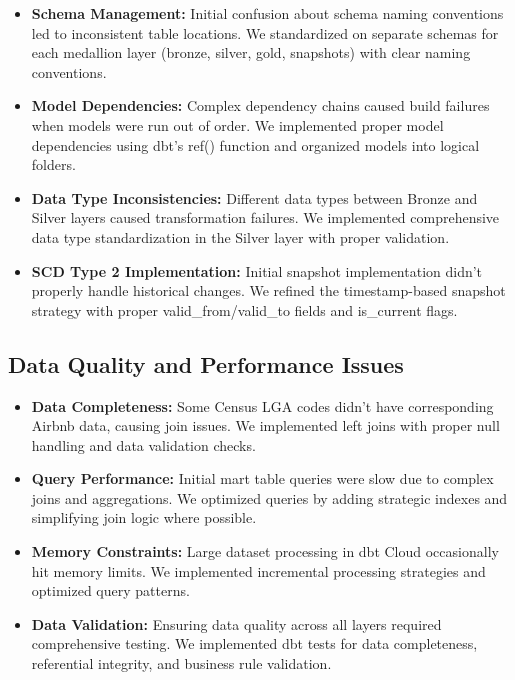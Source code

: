 \begin{itemize}
  \item \textbf{Schema Management:} Initial confusion about schema naming conventions led to inconsistent table locations. We standardized on separate schemas for each medallion layer (bronze, silver, gold, snapshots) with clear naming conventions.
  
  \item \textbf{Model Dependencies:} Complex dependency chains caused build failures when models were run out of order. We implemented proper model dependencies using dbt's ref() function and organized models into logical folders.
  
  \item \textbf{Data Type Inconsistencies:} Different data types between Bronze and Silver layers caused transformation failures. We implemented comprehensive data type standardization in the Silver layer with proper validation.
  
  \item \textbf{SCD Type 2 Implementation:} Initial snapshot implementation didn't properly handle historical changes. We refined the timestamp-based snapshot strategy with proper valid\_from/valid\_to fields and is\_current flags.
\end{itemize}

\subsection{Data Quality and Performance Issues}

\begin{itemize}
  \item \textbf{Data Completeness:} Some Census LGA codes didn't have corresponding Airbnb data, causing join issues. We implemented left joins with proper null handling and data validation checks.
  
  \item \textbf{Query Performance:} Initial mart table queries were slow due to complex joins and aggregations. We optimized queries by adding strategic indexes and simplifying join logic where possible.
  
  \item \textbf{Memory Constraints:} Large dataset processing in dbt Cloud occasionally hit memory limits. We implemented incremental processing strategies and optimized query patterns.
  
  \item \textbf{Data Validation:} Ensuring data quality across all layers required comprehensive testing. We implemented dbt tests for data completeness, referential integrity, and business rule validation.
\end{itemize}

